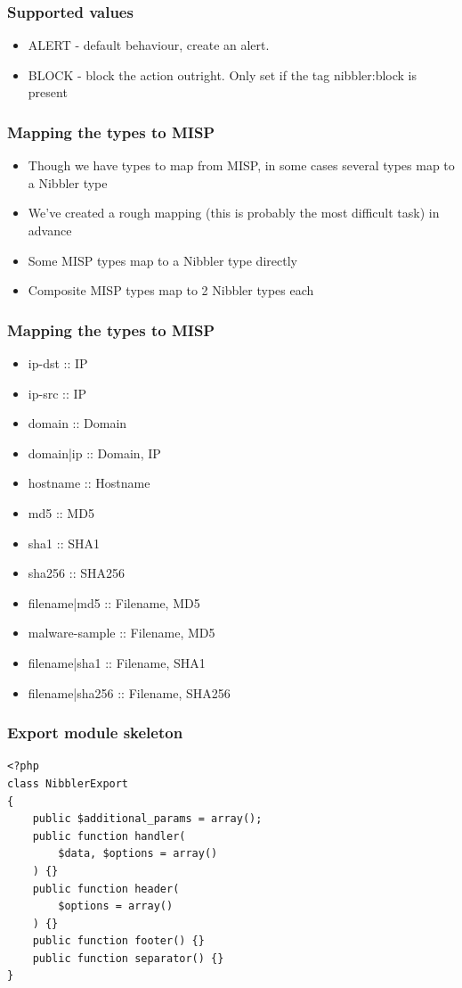\begin{frame}
  \frametitle{Supported values}
  \begin{itemize}
    \item ALERT - default behaviour, create an alert.
    \item BLOCK - block the action outright. Only set if the tag nibbler:block is present
  \end{itemize}
\end{frame}

\begin{frame}
  \frametitle{Mapping the types to MISP}
  \begin{itemize}
    \item Though we have types to map from MISP, in some cases several types map to a Nibbler type
    \item We've created a rough mapping (this is probably the most difficult task) in advance
    \item Some MISP types map to a Nibbler type directly
    \item Composite MISP types map to 2 Nibbler types each
  \end{itemize}
\end{frame}

\begin{frame}
  \frametitle{Mapping the types to MISP}
  \begin{itemize}
    \item ip-dst :: IP
    \item ip-src :: IP
    \item domain :: Domain
    \item domain|ip :: Domain, IP
    \item hostname :: Hostname
    \item md5 :: MD5
    \item sha1 :: SHA1
    \item sha256 :: SHA256
    \item filename|md5 :: Filename, MD5
    \item malware-sample :: Filename, MD5
    \item filename|sha1 :: Filename, SHA1
    \item filename|sha256 :: Filename, SHA256
  \end{itemize}
\end{frame}

\begin{frame}[fragile]
  \frametitle{Export module skeleton}
  \begin{lstlisting}
<?php
class NibblerExport
{
    public $additional_params = array();
    public function handler(
        $data, $options = array()
    ) {}
    public function header(
        $options = array()
    ) {}
    public function footer() {}
    public function separator() {}
}
  \end{lstlisting}
\end{frame}

